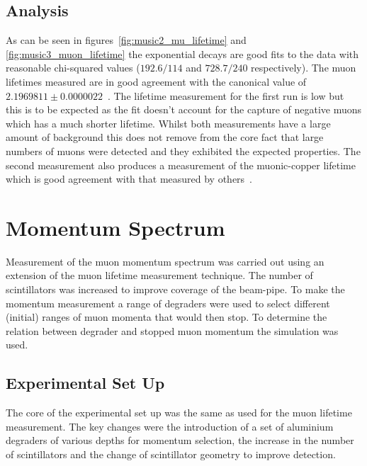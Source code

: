 \subsection{Analysis} %
\label{sec:analysis}
As can be seen in figures~\ref{fig:music2_mu_lifetime} and \ref{fig:music3_muon_lifetime} the exponential decays are good fits to the data with reasonable chi-squared values (\(192.6/114\) and \( 728.7/240 \) respectively). The muon lifetimes measured are in good agreement with the canonical value of \(2.1969811\pm0.0000022\)~\cite{pdg}. The lifetime measurement for the first run is low but this is to be expected as the fit doesn't account for the capture of negative muons which has a much shorter lifetime. Whilst both measurements have a large amount of background this does not remove from the core fact that large numbers of muons were detected and they exhibited the expected properties. The second measurement also produces a measurement of the muonic-copper lifetime which is good agreement with that measured by others~\cite{mu_neg_cu_lifetime}.

\clearpage
\section{Momentum Spectrum} %
\label{cha:momentum_spectrum}
Measurement of the muon momentum spectrum was carried out using an extension of the muon lifetime measurement technique. The number of scintillators was increased to improve coverage of the beam-pipe. To make the momentum measurement a range of degraders were used to select different (initial) ranges of muon momenta that would then stop. To determine the relation between degrader and stopped muon momentum the simulation was used.


\subsection{Experimental Set Up} %
\label{sec:experimental_set_up}
The core of the experimental set up was the same as used for the muon lifetime measurement. The key changes were the introduction of a set of aluminium degraders of various depths for momentum selection, the increase in the number of scintillators and the change of scintillator geometry to improve detection.

